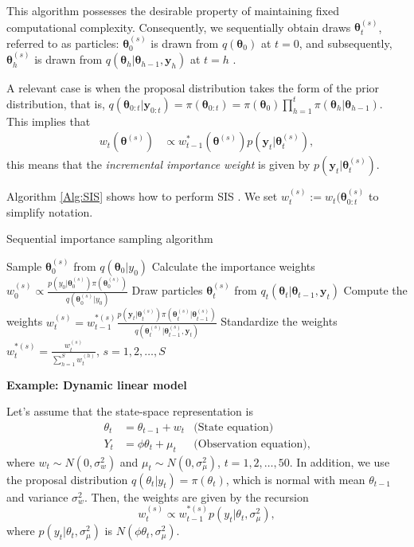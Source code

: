 This algorithm possesses the desirable property of maintaining fixed computational complexity. Consequently, we sequentially obtain draws $\bm{\theta}_t^{(s)}$, referred to as particles: $\bm{\theta}_0^{(s)}$ is drawn from $q(\bm{\theta}_0)$ at $t=0$, and subsequently, $\bm{\theta}_h^{(s)}$ is drawn from $q(\bm{\theta}_h|\bm{\theta}_{h-1},\bm{y}_{h})$ at $t=h$ \cite{doucet2001introduction,cappe2007overview}.

A relevant case is when the proposal distribution takes the form of the prior distribution, that is, $q(\bm{\theta}_{0:t}|\bm{y}_{0:t}) = \pi(\bm{\theta}_{0:t}) = \pi(\bm{\theta}_0)\prod_{h=1}^{t}\pi(\bm{\theta}_h|\bm{\theta}_{h-1})$. This implies that
\begin{align*}
	w_{t}(\bm{\theta}^{(s)})&\propto w_{t-1}^*(\bm{\theta}^{(s)})p(\bm{y}_{t}|\bm{\theta}_{t}^{(s)}),
\end{align*}
this means that the \textit{incremental importance weight} is given by $p(\bm{y}_{t}|\bm{\theta}_{t}^{(s)})$. 

Algorithm \ref{Alg:SIS} shows how to perform SIS \cite{cappe2007overview}. We set $w_t^{(s)}:=w_t(\bm{\theta}_{0:t}^{(s)}$ to simplify notation.\\
\begin{algorithm}[h!]
	\caption{Sequential importance sampling algorithm}\label{Alg:SIS}
	\begin{algorithmic}[1]
		\State Sample $\bm{\theta}_0^{(s)}$ from $q(\bm{\theta}_0|y_0)$
		\State Calculate the importance weights $w_0^{(s)}\propto\frac{p(y_0|\bm{\theta}_0^{(s)})\pi(\bm{\theta}_0^{(s)})}{q(\bm{\theta}_0^{(s)}|y_0)}$ 
		\EndFor 
				\State Draw particles $\bm{\theta}_t^{(s)}$ from $q_t(\bm{\theta}_t|\bm{\theta}_{t-1}, \bm{y}_t)$
				\State Compute the weights $w_t^{(s)}=w_{t-1}^{*(s)}\frac{p(\bm{y}_{t}|\bm{\theta}_{t}^{(s)})\pi(\bm{\theta}_{t}^{(s)}|\bm{\theta}_{t-1}^{(s)})}{q(\bm{\theta}_t^{(s)}|\bm{\theta}_{t-1}^{(s)},\bm{y}_{t})}$
			\EndFor
			\State Standardize the weights $w_t^{*(s)}=\frac{w_t^{(s)}}{\sum_{h=1}^Sw_t^{(h)}}$, $s=1,2,\dots,S$  
		\EndFor
	\end{algorithmic} 
\end{algorithm}

\textbf{Example: Dynamic linear model}

Let's assume that the state-space representation is  
\begin{align*}
	{\theta}_t &= {\theta}_{t-1} + {w}_t & \text{(State equation)} \nonumber\\
	Y_t & = \phi {\theta}_t + \mu_t & \text{(Observation equation)},
\end{align*}
where ${w}_t\sim N(0, \sigma_w^2)$ and $\mu_t\sim N(0,\sigma_{\mu}^2)$, $t=1,2,\dots,50$. In addition, we use the proposal distribution $q(\theta_t|y_t)=\pi(\theta_t)$, which is normal with mean $\theta_{t-1}$ and variance $\sigma_w^2$. Then, the weights are given by the recursion  
\[ 
w_t^{(s)} \propto w_{t-1}^{*(s)} p(y_t|\theta_t,\sigma_{\mu}^2), 
\]  
where $p(y_t|\theta_t,\sigma_{\mu}^2)$ is $N(\phi \theta_t, \sigma_{\mu}^2)$.  

